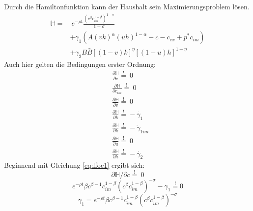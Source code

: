 Durch die Hamiltonfunktion kann der Haushalt sein Maximierungsproblem lösen.\\
\begin{equation}
\begin{split}\mathbb{H}=&~e^{-\rho t}\frac{(c^\beta c_{im}^{1-\beta})^{1-\sigma}}{1-\sigma}\\
&+\gamma_1(A(vk)^\alpha(uh)^{1-\alpha}-c-c_{ex}+p^*c_{im})\\
&+\gamma_2B\bar{B}[(1-v)k]^{\eta}[(1-u)h]^{1-\eta}\end{split}
\end{equation}
Auch hier gelten die Bedingungen erster Ordnung:\\
\begin{align}
&\frac{\partial\mathbb{H}}{\partial c}\overset{!}{=}~0\label{eq:lfoc1}\\
&\frac{\partial\mathbb{H}}{\partial c_{im}}\overset{!}{=}~0\label{eq:lfoc1im}\\
&\frac{\partial\mathbb{H}}{\partial v}\overset{!}{=}~0\label{eq:lfoc2}\\
&\frac{\partial\mathbb{H}}{\partial k}\overset{!}{=}-\dot{\gamma_1}\label{eq:lfoc3}\\
&\frac{\partial\mathbb{H}}{\partial k}\overset{!}{=}-\dot{\gamma}_{1im}\label{eq:lfoc3im}\\
&\frac{\partial\mathbb{H}}{\partial u}\overset{!}{=}~0\label{eq:lfoc4}\\
&\frac{\partial\mathbb{H}}{\partial h}\overset{!}{=}-\dot{\gamma_2}\label{eq:lfoc5}\end{align}
Beginnend mit Gleichung \eqref{eq:lfoc1} ergibt sich:\\
\begin{equation*}
\partial\mathbb{H}/\partial c\overset{!}{=}~0
\end{equation*}
\begin{equation}
e^{-\rho t}\beta c^{\beta-1}c_{im}^{1-\beta}(c^\beta c_{im}^{1-\beta})^{-\sigma}-\gamma_1\overset{!}{=}0\label{eq:lfoc1a}
\end{equation}
\vspace{-0.7cm}
\begin{equation}
\gamma_1=e^{-\rho t}\beta c^{\beta-1}c_{im}^{1-\beta}(c^\beta c_{im}^{1-\beta})^{-\sigma}\label{eq:lfoc1b}
\end{equation}
